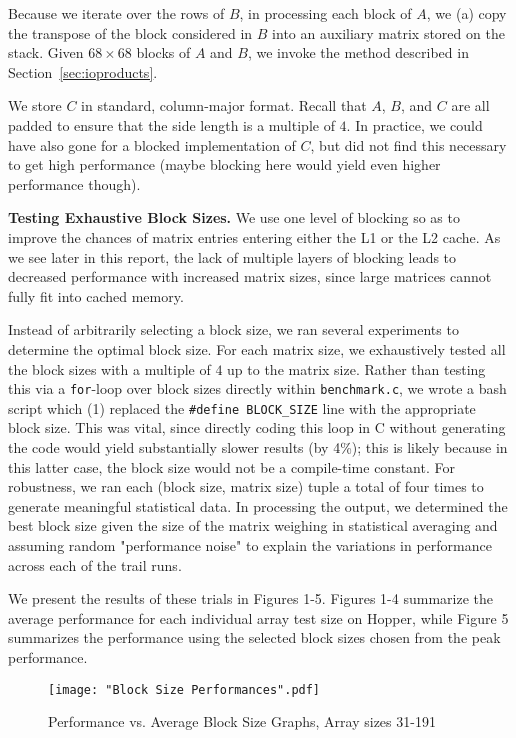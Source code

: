 \documentclass{article} %
\begin{document}
Because we iterate over the rows of $B$, in processing
each block of $A$, we (a) copy the transpose of the block considered in $B$ into
an auxiliary matrix stored on the stack. Given $68\times 68$ blocks of $A$ and
$B$, we invoke the method described in Section~\ref{sec:ioproducts}.

We store $C$ in standard, column-major format. Recall that $A$, $B$, and $C$
are all padded to ensure that the side length is a multiple of $4$. In practice,
we could have also gone for a blocked implementation of $C$, but did not find
this necessary to get high performance (maybe blocking here would yield even
higher performance though).

\textbf{Testing Exhaustive Block Sizes.} We use one level
of blocking so as to improve the chances of matrix entries entering either the
L1 or the L2 cache. As we see later in this report, the lack of multiple layers
of blocking leads to decreased performance with increased matrix sizes, since
large matrices cannot fully fit into cached memory.

Instead of arbitrarily selecting a block size, we ran several experiments to determine the optimal block size. For each matrix size, we exhaustively tested all the block sizes with a multiple of $4$ up
to the matrix size. Rather than testing this via a \texttt{for}-loop over block sizes
directly within \texttt{benchmark.c}, we wrote a bash script which (1) replaced the
\texttt{\#define BLOCK\_SIZE} line with the appropriate block size. This was vital,
since directly coding this loop in C without generating the code would yield
substantially slower results (by 4\%); this is likely because in this latter case,
the block size would not be a compile-time constant. For robustness, we ran each
(block size, matrix size) tuple a total of four times to generate meaningful statistical data. In processing the output, we determined the best block size given the size of the matrix weighing in statistical averaging and assuming random "performance noise" to explain the variations in performance across each of the trail runs.

We present the results of these trials in Figures 1-5. Figures 1-4 summarize the
average performance for each individual array test size on Hopper, while Figure 5 summarizes
the performance using the selected block sizes chosen from the peak performance.

\clearpage
%
\begin{figure}
 \noindent
 \hspace*{-1.5in}
 \texttt{[image: "Block Size Performances".pdf]} %
 \caption{Performance vs. Average Block Size Graphs, Array sizes 31-191}
\end{figure}
\end{document}
